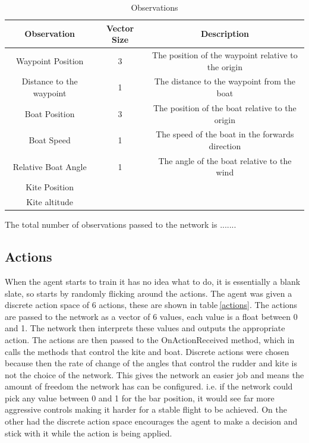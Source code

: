 \begin{table}[h]
    \centering
    \begin{tabular}{c|c|c}
        Observation & Vector Size & Description \\
        \midrule
        Waypoint Position & 3 & The position of the waypoint relative to the origin \\
        Distance to the waypoint & 1 & The distance to the waypoint from the boat \\
        Boat Position & 3 & The position of the boat relative to the origin \\
        Boat Speed & 1 & The speed of the boat in the forwards direction \\
        Relative Boat Angle & 1 & The angle of the boat relative to the wind \\
        Kite Position & &\\
        Kite altitude & &\\
        \hline
    \end{tabular}
    \caption{Observations}\label{observations}
\end{table}

The total number of observations passed to the network is .......

\subsection{Actions}
When the agent starts to train it has no idea what to do, it is essentially a blank slate, so starts by randomly flicking around the actions. The agent was given a discrete action space of 6 actions, these are shown in table$~$\ref{actions}. The actions are passed to the network as a vector of 6 values, each value is a float between 0 and 1. The network then interprets these values and outputs the appropriate action. The actions are then passed to the OnActionReceived method, which in calls the methods that control the kite and boat. Discrete actions were chosen because then the rate of change of the angles that control the rudder and kite is not the choice of the network. This gives the network an easier job and means the amount of freedom the network has can be configured. i.e. if the network could pick any value between 0 and 1 for the bar position, it would see far more aggressive controls making it harder for a stable flight to be achieved. On the other had the discrete action space encourages the agent to make a decision and stick with it while the action is being applied. 


